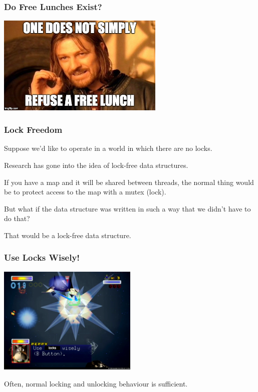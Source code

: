 
\begin{frame}
\frametitle{Do Free Lunches Exist?}

\begin{center}
\includegraphics[width=0.6\textwidth]{images/freelunch.jpg}
\end{center}

\end{frame}


\begin{frame}
\frametitle{Lock Freedom}

Suppose we'd like to operate in a world in which there are no locks. 

Research has gone into the idea of lock-free data structures. 

If you have a map and it will be shared between threads, the normal thing would be to protect access to the map with a mutex (lock). 

But what if the data structure was written in such a way that we didn't have to do that? 

That would be a lock-free data structure.

\end{frame}

\begin{frame}
\frametitle{Use Locks Wisely!}

\begin{center}
	\includegraphics[width=0.5\textwidth]{images/usebombswisely.png}
\end{center}

Often, normal locking and unlocking behaviour is sufficient.

\end{frame}

